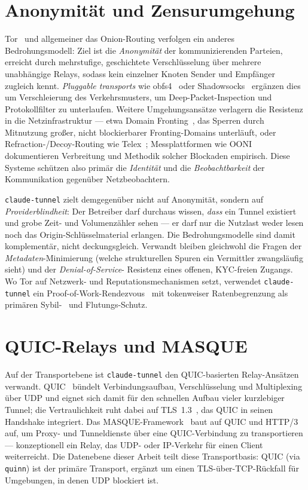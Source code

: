 \section{Anonymität und Zensurumgehung}
\label{sec:rw-anon}

Tor~\cite{dingledine2004tor} und allgemeiner das Onion-Routing verfolgen ein anderes Bedrohungsmodell:
Ziel ist die \emph{Anonymität} der kommunizierenden Parteien, erreicht durch
mehrstufige, geschichtete Verschlüsselung über mehrere unabhängige Relays, sodass
kein einzelner Knoten Sender und Empfänger zugleich kennt. \emph{Pluggable
transports} wie obfs4~\cite{obfs4} oder Shadowsocks~\cite{shadowsocks} ergänzen dies um Verschleierung des
Verkehrsmusters, um Deep-Packet-Inspection und Protokollfilter zu unterlaufen.
Weitere Umgehungsansätze verlagern die Resistenz in die Netzinfrastruktur ---
etwa Domain Fronting~\cite{fifield2015domainfronting}, das Sperren durch
Mitnutzung großer, nicht blockierbarer Fronting-Domains unterläuft, oder
Refraction-/Decoy-Routing wie Telex~\cite{wustrow2011telex}; Messplattformen wie
OONI~\cite{filasto2012ooni} dokumentieren Verbreitung und Methodik solcher
Blockaden empirisch. Diese Systeme schützen also primär die \emph{Identität} und
die \emph{Beobachtbarkeit} der Kommunikation gegenüber Netzbeobachtern.

\texttt{claude-tunnel} zielt demgegenüber nicht auf Anonymität, sondern auf
\emph{Providerblindheit}: Der Betreiber darf durchaus wissen, \emph{dass} ein
Tunnel existiert und grobe Zeit- und Volumenzähler sehen --- er darf nur die
Nutzlast weder lesen noch das Origin-Schlüsselmaterial erlangen. Die
Bedrohungsmodelle sind damit komplementär, nicht deckungsgleich. Verwandt bleiben
gleichwohl die Fragen der \emph{Metadaten}-Minimierung (welche strukturellen
Spuren ein Vermittler zwangsläufig sieht) und der \emph{Denial-of-Service}-
Resistenz eines offenen, KYC-freien Zugangs. Wo Tor auf Netzwerk- und
Reputationsmechanismen setzt, verwendet \texttt{claude-tunnel} ein
Proof-of-Work-Rendezvous~\cite{back2002hashcash} mit tokenweiser Ratenbegrenzung
als primären Sybil-~\cite{douceur2002sybil} und Flutungs-Schutz.

\section{QUIC-Relays und MASQUE}
\label{sec:rw-quic}

Auf der Transportebene ist \texttt{claude-tunnel} den QUIC-basierten
Relay-Ansätzen verwandt. QUIC~\cite{rfc9000} bündelt Verbindungsaufbau,
Verschlüsselung und Multiplexing über UDP und eignet sich damit für den
schnellen Aufbau vieler kurzlebiger Tunnel; die Vertraulichkeit ruht dabei auf
TLS~1.3~\cite{rfc8446}, das QUIC in seinen Handshake integriert. Das
MASQUE-Framework~\cite{rfc9298,rfc9484} baut auf QUIC
und HTTP/3 auf, um Proxy- und Tunneldienste über eine QUIC-Verbindung zu
transportieren --- konzeptionell ein Relay, das UDP- oder IP-Verkehr für einen
Client weiterreicht. Die Datenebene dieser Arbeit teilt diese Transportbasis:
QUIC (via \texttt{quinn}) ist der primäre Transport, ergänzt um einen
TLS-über-TCP-Rückfall für Umgebungen, in denen UDP blockiert ist.

